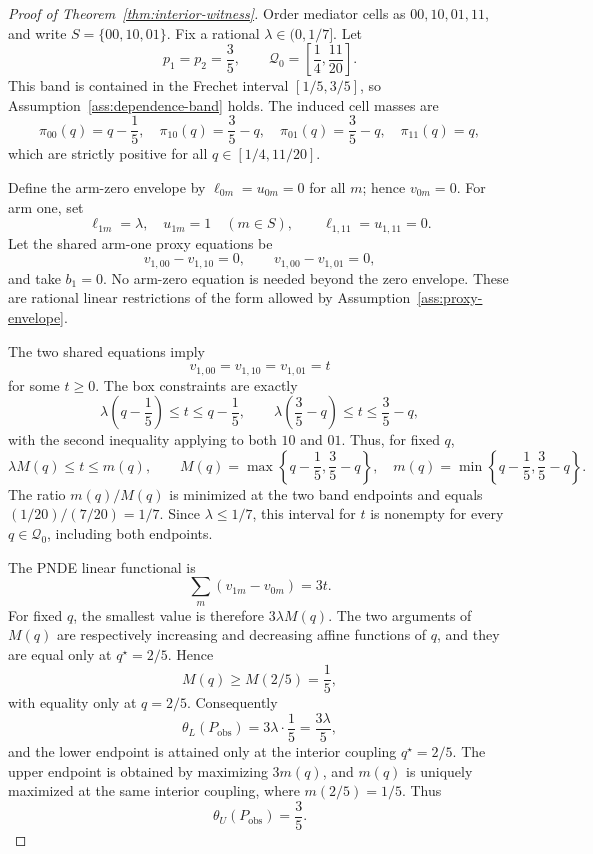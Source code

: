 \documentclass[11pt]{article}
\theoremstyle{definition}
\theoremstyle{plain}
\theoremstyle{remark}
\begin{document}
\begin{proof}[Proof of Theorem~\ref{thm:interior-witness}]
Order mediator cells as \(00,10,01,11\), and write
\(S=\{00,10,01\}\).  Fix a rational \(\lambda\in(0,1/7]\).  Let
\[
  p_1=p_2=\frac35,\qquad
  \mathcal Q_0=\left[\frac14,\frac{11}{20}\right].
\]
This band is contained in the Frechet interval
\([1/5,3/5]\), so Assumption~\ref{ass:dependence-band} holds.  The induced
cell masses are
\[
  \pi_{00}(q)=q-\frac15,\quad
  \pi_{10}(q)=\frac35-q,\quad
  \pi_{01}(q)=\frac35-q,\quad
  \pi_{11}(q)=q,
\]
which are strictly positive for all \(q\in[1/4,11/20]\).

Define the arm-zero envelope by \(\ell_{0m}=u_{0m}=0\) for all \(m\); hence
\(v_{0m}=0\).  For arm one, set
\[
  \ell_{1m}=\lambda,\quad u_{1m}=1\quad(m\in S),
  \qquad
  \ell_{1,11}=u_{1,11}=0.
\]
Let the shared arm-one proxy equations be
\[
  v_{1,00}-v_{1,10}=0,\qquad
  v_{1,00}-v_{1,01}=0,
\]
and take \(b_1=0\).  No arm-zero equation is needed beyond the zero envelope.
These are rational linear restrictions of the form allowed by
Assumption~\ref{ass:proxy-envelope}.

The two shared equations imply
\[
  v_{1,00}=v_{1,10}=v_{1,01}=t
\]
for some \(t\ge0\).  The box constraints are exactly
\[
  \lambda\left(q-\frac15\right)\le t\le q-\frac15,\qquad
  \lambda\left(\frac35-q\right)\le t\le \frac35-q,
\]
with the second inequality applying to both \(10\) and \(01\).  Thus, for
fixed \(q\),
\[
  \lambda M(q)\le t\le m(q),
  \qquad
  M(q)=\max\left\{q-\frac15,\frac35-q\right\},
  \quad
  m(q)=\min\left\{q-\frac15,\frac35-q\right\}.
\]
The ratio \(m(q)/M(q)\) is minimized at the two band endpoints and equals
\((1/20)/(7/20)=1/7\).  Since \(\lambda\le1/7\), this interval for \(t\) is
nonempty for every \(q\in\mathcal Q_0\), including both endpoints.

The PNDE linear functional is
\[
  \sum_m(v_{1m}-v_{0m})=3t.
\]
For fixed \(q\), the smallest value is therefore \(3\lambda M(q)\).  The two
arguments of \(M(q)\) are respectively increasing and decreasing affine
functions of \(q\), and they are equal only at \(q^\star=2/5\).  Hence
\[
  M(q)\ge M(2/5)=\frac15,
\]
with equality only at \(q=2/5\).  Consequently
\[
  \theta_L(P_{\mathrm{obs}})=3\lambda\cdot\frac15=\frac{3\lambda}{5},
\]
and the lower endpoint is attained only at the interior coupling
\(q^\star=2/5\).  The upper endpoint is obtained by maximizing
\(3m(q)\), and \(m(q)\) is uniquely maximized at the same interior coupling,
where \(m(2/5)=1/5\).  Thus
\[
  \theta_U(P_{\mathrm{obs}})=\frac35.
\]


\end{proof}
\end{document}
